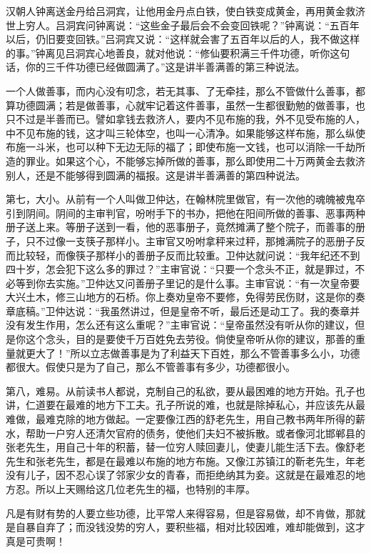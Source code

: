 \documentclass[12pt,UTF8]{ctexbook}
\begin{document}
汉朝人钟离送金丹给吕洞宾，让他用金丹点白铁，使白铁变成黄金，再用黄金救济世上穷人。吕洞宾问钟离说：“这些金子最后会不会变回铁呢？”钟离说：“五百年以后，仍旧要变回铁。”吕洞宾又说：“这样就会害了五百年以后的人，我不做这样的事。”钟离见吕洞宾心地善良，就对他说：“修仙要积满三千件功德，听你这句话，你的三千件功德已经做圆满了。”这是讲半善满善的第三种说法。

一个人做善事，而内心没有叨念，若无其事、了无牵挂，那么不管做什么善事，都算功德圆满；若是做善事，心就牢记着这件善事，虽然一生都很勤勉的做善事，也只不过是半善而已。譬如拿钱去救济人，要内不见布施的我，外不见受布施的人，中不见布施的钱，这才叫三轮体空，也叫一心清净。如果能够这样布施，那么纵使布施一斗米，也可以种下无边无际的福了；即使布施一文钱，也可以消除一千劫所造的罪业。如果这个心，不能够忘掉所做的善事，那么即使用二十万两黄金去救济别人，还是不能够得到圆满的福报。这是讲半善满善的第四种说法。

第七，大小。从前有一个人叫做卫仲达，在翰林院里做官，有一次他的魂魄被鬼卒引到阴间。阴间的主审判官，吩咐手下的书办，把他在阳间所做的善事、恶事两种册子送上来。等册子送到一看，他的恶事册子，竟然摊满了整个院子，而善事的册子，只不过像一支筷子那样小。主审官又吩咐拿秤来过秤，那摊满院子的恶册子反而比较轻，而像筷子那样小的善册子反而比较重。卫仲达就问说：“我年纪还不到四十岁，怎会犯下这么多的罪过？”主审官说：“只要一个念头不正，就是罪过，不必等到你去实施。”卫仲达又问善册子里记的是什么事。主审官说：“有一次皇帝要大兴土木，修三山地方的石桥。你上奏劝皇帝不要修，免得劳民伤财，这是你的奏章底稿。”卫仲达说：“我虽然讲过，但是皇帝不听，最后还是动工了。我的奏章并没有发生作用，怎么还有这么重呢？”主审官说：“皇帝虽然没有听从你的建议，但是你这个念头，目的是要使千万百姓免去劳役。倘使皇帝听从你的建议，那善的重量就更大了！”所以立志做善事是为了利益天下百姓，那么不管善事多么小，功德都很大。假使只是为了自己，那么不管善事有多少，功德都很小。

第八，难易。从前读书人都说，克制自己的私欲，要从最困难的地方开始。孔子也讲，仁道要在最难的地方下工夫。孔子所说的难，也就是除掉私心，并应该先从最难做，最难克除的地方做起。一定要像江西的舒老先生，用自己教书两年所得的薪水，帮助一户穷人还清欠官府的债务，使他们夫妇不被拆散。或者像河北邯郸县的张老先生，用自己十年的积蓄，替一位穷人赎回妻儿，使妻儿能生活下去。像舒老先生和张老先生，都是在最难以布施的地方布施。又像江苏镇江的靳老先生，年老没有儿子，因不忍心误了邻家少女的青春，而拒绝纳其为妾。这就是在最难忍的地方忍。所以上天赐给这几位老先生的福，也特别的丰厚。

凡是有财有势的人要立些功德，比平常人来得容易，但是容易做，却不肯做，那就是自暴自弃了；而没钱没势的穷人，要积些福，相对比较因难，难却能做到，这才真是可贵啊！
\end{document}
